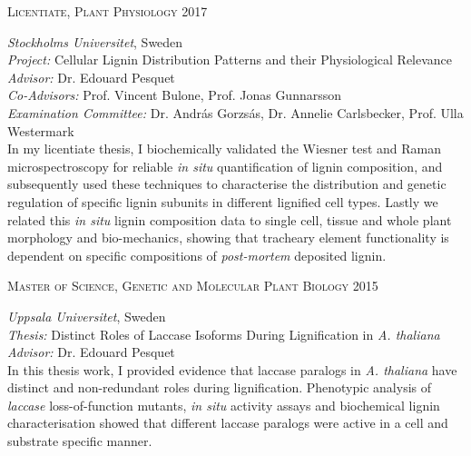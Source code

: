 \documentclass[11pt]{article}
\begin{document}
\textsc{\large{Licentiate, Plant Physiology} \hfill \textsc{2017}}
\begin{addmargin}[24pt]{0pt}
	\textit{Stockholms Universitet}, Sweden \\
	\textit{Project:} Cellular Lignin Distribution Patterns and their Physiological Relevance \\
	\textit{Advisor:} Dr. Edouard Pesquet \\
	\textit{Co-Advisors:} Prof. Vincent Bulone, Prof. Jonas Gunnarsson\\
	\textit{Examination Committee:} Dr. András Gorzsás, Dr. Annelie Carlsbecker, Prof. Ulla Westermark
	\vspace{0.1cm} \\
	\small{In my licentiate thesis, I biochemically validated the Wiesner test and Raman microspectroscopy for reliable \textit{in situ} quantification of lignin composition, and subsequently used these techniques to characterise the distribution and genetic regulation of specific lignin subunits in different lignified cell types. Lastly we related this \textit{in situ} lignin composition data to single cell, tissue and whole plant morphology and bio-mechanics, showing that tracheary element functionality is dependent on specific compositions of \textit{post-mortem} deposited lignin.}
\end{addmargin}
\vspace{0.2cm}

\textsc{\large{Master of Science, Genetic and Molecular Plant Biology} \hfill \textsc{2015}}
\begin{addmargin}[24pt]{0pt}
	\textit{Uppsala Universitet}, Sweden \\
	\textit{Thesis:} Distinct Roles of Laccase Isoforms During Lignification in \textit{ A. thaliana}\\
	\textit{Advisor:} Dr. Edouard Pesquet
	\vspace{0.1cm} \\
	\small{In this thesis work, I provided evidence that laccase paralogs in \textit{A. thaliana} have distinct and non-redundant roles during lignification. Phenotypic analysis of \textit{laccase} loss-of-function mutants, \textit{in situ} activity assays and biochemical lignin characterisation showed that different laccase paralogs were active in a cell and substrate specific manner.}
\end{addmargin}
\vspace{0.2cm}
\end{document}
